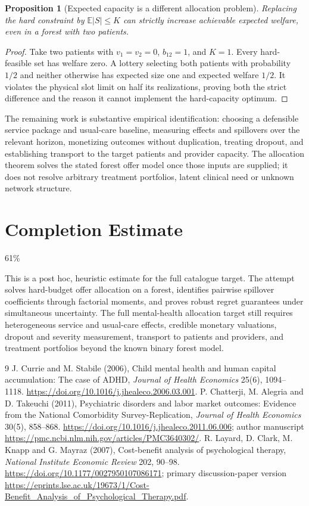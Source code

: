 \documentclass[11pt]{article}
\newtheorem{proposition}[theorem]{Proposition}
\theoremstyle{remark}\newtheorem{remark}[theorem]{Remark}
\newcommand{\E}{\mathbb E}
\begin{document}
\begin{proposition}[Expected capacity is a different allocation problem]
Replacing the hard constraint by $\E|S|\le K$ can strictly increase achievable expected welfare, even in a forest with two patients.
\end{proposition}
\begin{proof}
Take two patients with $v_1=v_2=0$, $b_{12}=1$, and $K=1$. Every hard-feasible set has welfare zero. A lottery selecting both patients with probability $1/2$ and neither otherwise has expected size one and expected welfare $1/2$. It violates the physical slot limit on half its realizations, proving both the strict difference and the reason it cannot implement the hard-capacity optimum.
\end{proof}

The remaining work is substantive empirical identification: choosing a defensible service package and usual-care baseline, measuring effects and spillovers over the relevant horizon, monetizing outcomes without duplication, treating dropout, and establishing transport to the target patients and provider capacity. The allocation theorem solves the stated forest offer model once those inputs are supplied; it does not resolve arbitrary treatment portfolios, latent clinical need or unknown network structure.

\section{Completion Estimate}
61\%

This is a post hoc, heuristic estimate for the full catalogue target.
The attempt solves hard-budget offer allocation on a forest, identifies pairwise spillover coefficients through factorial moments, and proves robust regret guarantees under simultaneous uncertainty. The full mental-health allocation target still requires heterogeneous service and usual-care effects, credible monetary valuations, dropout and severity measurement, transport to patients and providers, and treatment portfolios beyond the known binary forest model.

\begin{thebibliography}{9}
 J. Currie and M. Stabile (2006), Child mental health and human capital accumulation: The case of ADHD, \emph{Journal of Health Economics} 25(6), 1094--1118. \url{https://doi.org/10.1016/j.jhealeco.2006.03.001}.
 P. Chatterji, M. Alegria and D. Takeuchi (2011), Psychiatric disorders and labor market outcomes: Evidence from the National Comorbidity Survey-Replication, \emph{Journal of Health Economics} 30(5), 858--868. \url{https://doi.org/10.1016/j.jhealeco.2011.06.006}; author manuscript \url{https://pmc.ncbi.nlm.nih.gov/articles/PMC3640302/}.
 R. Layard, D. Clark, M. Knapp and G. Mayraz (2007), Cost-benefit analysis of psychological therapy, \emph{National Institute Economic Review} 202, 90--98. \url{https://doi.org/10.1177/0027950107086171}; primary discussion-paper version \url{https://eprints.lse.ac.uk/19673/1/Cost-Benefit_Analysis_of_Psychological_Therapy.pdf}.
\end{thebibliography}
\end{document}
